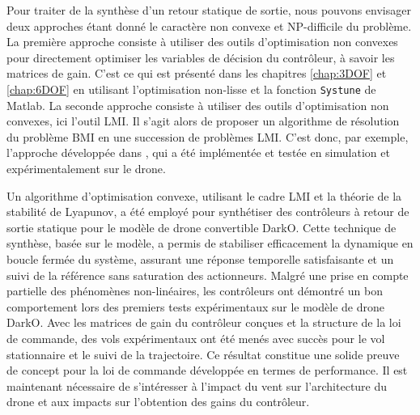 Pour traiter de la synthèse d'un retour statique de sortie, nous pouvons envisager deux approches étant donné le caractère non convexe et NP-difficile du problème. La première approche consiste à utiliser des outils d'optimisation non convexes pour directement optimiser les variables de décision du contrôleur, à savoir les matrices de gain. C'est ce qui est présenté dans les chapitres \ref{chap:3DOF} et \ref{chap:6DOF} en utilisant l'optimisation  non-lisse et la fonction {\tt Systune} de Matlab. La seconde approche consiste à utiliser des outils d'optimisation non convexes, ici l'outil LMI. Il s'agit alors de proposer un algorithme de résolution du problème BMI en une succession de problèmes LMI. C'est donc, par exemple, l'approche développée dans \cite{Arzelier2018}, qui a été implémentée et testée en simulation et expérimentalement sur le drone. 

Un algorithme d'optimisation convexe, utilisant le cadre LMI et la théorie de la stabilité de Lyapunov, a été employé pour synthétiser des contrôleurs à retour de sortie statique pour le modèle de drone convertible DarkO. Cette technique de synthèse, basée sur le modèle, a permis de stabiliser efficacement la dynamique en boucle fermée du système, assurant une réponse temporelle satisfaisante et un suivi de la référence sans saturation des actionneurs. Malgré une prise en compte partielle des phénomènes non-linéaires, les contrôleurs ont démontré un bon comportement lors des premiers tests expérimentaux sur le modèle de drone DarkO. Avec les matrices de gain du contrôleur conçues et la structure de la loi de commande, des vols expérimentaux ont été menés avec succès pour le vol stationnaire et le suivi de la trajectoire. Ce résultat constitue une solide preuve de concept pour la loi de commande développée en termes de performance.
Il est maintenant nécessaire de s'intéresser à l'impact du vent sur l'architecture du drone et aux impacts sur l'obtention des gains du contrôleur.

